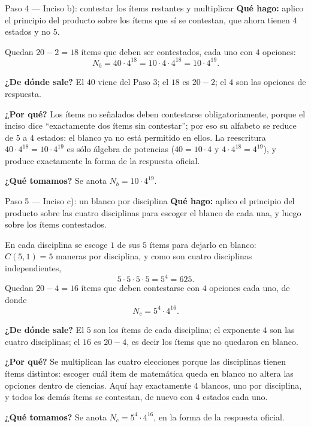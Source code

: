 \documentclass[11pt]{article}
\begin{document}
\begin{paso}{Paso 4 --- Inciso b): contestar los ítems restantes y multiplicar}
\textbf{Qué hago:} aplico el principio del producto sobre los ítems que sí se contestan, que ahora tienen $4$ estados y no $5$.

Quedan $20-2=18$ ítems que deben ser contestados, cada uno con $4$ opciones:
\[
  N_b = 40\cdot 4^{18} = 10\cdot 4\cdot 4^{18} = 10\cdot 4^{19}.
\]

\textbf{¿De dónde sale?} El $40$ viene del Paso 3; el $18$ es $20-2$; el $4$ son las opciones de respuesta.

\textbf{¿Por qué?} Los ítems no señalados deben contestarse obligatoriamente, porque el inciso dice ``exactamente dos ítems sin contestar''; por eso su alfabeto se reduce de $5$ a $4$ estados: el blanco ya no está permitido en ellos. La reescritura $40\cdot 4^{18}=10\cdot 4^{19}$ es sólo álgebra de potencias ($40=10\cdot 4$ y $4\cdot 4^{18}=4^{19}$), y produce exactamente la forma de la respuesta oficial.

\textbf{¿Qué tomamos?} Se anota $N_b=10\cdot 4^{19}$.
\end{paso}

\begin{paso}{Paso 5 --- Inciso c): un blanco por disciplina}
\textbf{Qué hago:} aplico el principio del producto sobre las cuatro disciplinas para escoger el blanco de cada una, y luego sobre los ítems contestados.

En cada disciplina se escoge $1$ de sus $5$ ítems para dejarlo en blanco: $C(5,1)=5$ maneras por disciplina, y como son cuatro disciplinas independientes,
\[
  5\cdot 5\cdot 5\cdot 5 = 5^{4} = 625 .
\]
Quedan $20-4=16$ ítems que deben contestarse con $4$ opciones cada uno, de donde
\[
  N_c = 5^{4}\cdot 4^{16} .
\]

\textbf{¿De dónde sale?} El $5$ son los ítems de cada disciplina; el exponente $4$ son las cuatro disciplinas; el $16$ es $20-4$, es decir los ítems que no quedaron en blanco.

\textbf{¿Por qué?} Se multiplican las cuatro elecciones porque las disciplinas tienen ítems distintos: escoger cuál ítem de matemática queda en blanco no altera las opciones dentro de ciencias. Aquí hay exactamente $4$ blancos, uno por disciplina, y todos los demás ítems se contestan, de nuevo con $4$ estados cada uno.

\textbf{¿Qué tomamos?} Se anota $N_c=5^4\cdot 4^{16}$, en la forma de la respuesta oficial.
\end{paso}
\end{document}

